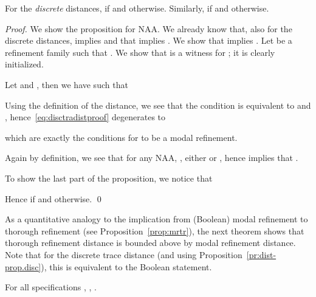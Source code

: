 \documentclass[twocolumn]{svjour3-dummy}
\newcommand*\NAA{NAA\xspace}
\begin{document}
\begin{proposition}
  \label{pr:dist-prop.disc}
  For the \emph{discrete} distances,  if
   and  otherwise.  Similarly,  if  and  otherwise.
\end{proposition}

\begin{proof}We show the proposition for \NAA.  We already know that, also for the
  discrete distances,  implies 
  and that  implies .  We show
  that  implies .  Let  be a refinement
  family such that .  We show that  is a witness for ; it is clearly initialized.

  Let  and , then we have
   such that
  
  Using the definition of the distance, we see that the condition  is equivalent to  and ,
  hence~\eqref{eq:disctradistproof} degenerates to
  
  which are exactly the conditions for  to be a modal refinement.

  Again by definition, we see that for any \NAA , , either
   or , hence
   implies that .

  To show the last part of the proposition, we notice that
  
  Hence  if  and  otherwise.  \qed
\end{proof}

As a quantitative analogy to the implication from (Boolean) modal
refinement to thorough refinement (see Proposition~\ref{prop:mrtr}), the
next theorem shows that thorough refinement distance is bounded above by
modal refinement distance.  Note that for the discrete trace distance
(and using Proposition~\ref{pr:dist-prop.disc}), this is equivalent to
the Boolean statement.

\begin{theorem}
  \label{th:mdl-vs-tdl}
  For all specifications , , .
\end{theorem}
\end{document}
